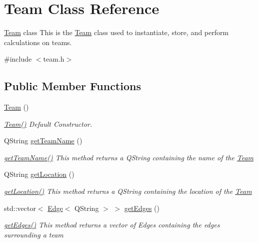 \hypertarget{class_team}{}\section{Team Class Reference}
\label{class_team}


\mbox{\hyperlink{class_team}{Team}} class This is the \mbox{\hyperlink{class_team}{Team}} class used to instantiate, store, and perform calculations on teams.  




{\ttfamily \#include $<$team.\+h$>$}

\subsection*{Public Member Functions}
\begin{DoxyCompactItemize}
\item 
\mbox{\label{class_team_aada295895b747960576b69d8c87a54ba}} 
\mbox{\hyperlink{class_team_aada295895b747960576b69d8c87a54ba}{Team}} ()
\begin{DoxyCompactList}\small\item\em \mbox{\hyperlink{class_team_aada295895b747960576b69d8c87a54ba}{Team()}} Default Constructor. \end{DoxyCompactList}\item 
Q\+String \mbox{\hyperlink{class_team_a36148ba356032791f4789a493e1ee149}{get\+Team\+Name}} ()
\begin{DoxyCompactList}\small\item\em \mbox{\hyperlink{class_team_a36148ba356032791f4789a493e1ee149}{get\+Team\+Name()}} This method returns a Q\+String containing the name of the \mbox{\hyperlink{class_team}{Team}} \end{DoxyCompactList}\item 
Q\+String \mbox{\hyperlink{class_team_a111f7ada960236792e4a82e1e5612d0b}{get\+Location}} ()
\begin{DoxyCompactList}\small\item\em \mbox{\hyperlink{class_team_a111f7ada960236792e4a82e1e5612d0b}{get\+Location()}} This method returns a Q\+String containing the location of the \mbox{\hyperlink{class_team}{Team}} \end{DoxyCompactList}\item 
std\+::vector$<$ \mbox{\hyperlink{struct_edge}{Edge}}$<$ Q\+String $>$ $>$ \mbox{\hyperlink{class_team_a04db74ce13bfe7c9d9fdf133920b5d72}{get\+Edges}} ()
\begin{DoxyCompactList}\small\item\em \mbox{\hyperlink{class_team_a04db74ce13bfe7c9d9fdf133920b5d72}{get\+Edges()}} This method returns a vector of Edges containing the edges surrounding a team \end{DoxyCompactList}\item 

\end{DoxyCompactItemize}
